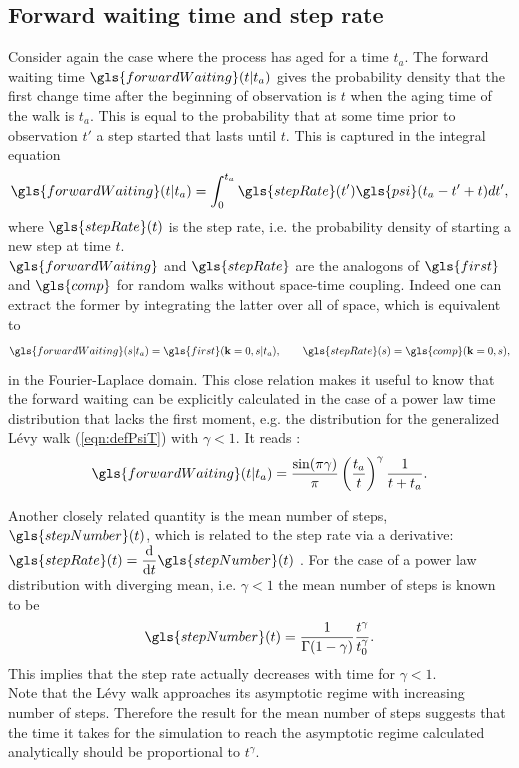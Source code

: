 \subsection{Forward waiting time and step rate} 
\label{sec:forwardWaiting}

Consider again the case where the process has aged for a time $t_a$. The forward waiting time $\gls{forwardWaiting}(t|t_a)$ gives the probability density that the first change time after the beginning of observation is $t$ when the aging time of the walk is $t_a$. This is equal to the probability that at some time prior to observation $t'$ a step started that lasts until $t$. This is captured in the integral equation 
%
\begin{align}
\gls{forwardWaiting}(t|t_a) = \int^{t_a}_{0} \gls{stepRate}(t') \gls{psi}(t_a-t'+t) dt',
\end{align}
%
where $\gls{stepRate}(t)$ is the step rate, i.e. the probability density of starting a new step at time $t$. \\
$\gls{forwardWaiting}$ and $\gls{stepRate}$ are the analogons of $\gls{first}$ and $\gls{comp}$ for random walks without space-time coupling. Indeed one can extract the former by integrating the latter over all of space, which is equivalent to
%
\begin{align}
\gls{forwardWaiting}(s|t_a) = \gls{first}(\ve{k}=0,s|t_a), \qquad \gls{stepRate}(s) = \gls{comp}(\ve{k}=0,s)  ,
\end{align}
%
in the Fourier-Laplace domain. This close relation makes it useful to know that the forward waiting can be explicitly calculated in the case of a power law time distribution that lacks the first moment, e.g. the distribution for the generalized L\'evy walk (\ref{eqn:defPsiT}) with $\gamma < 1$.  It reads 
\cite{firstSteps}:
%
\begin{align}
\gls{forwardWaiting}(t|t_a) = \frac{\sin(\pi \gamma)}{\pi} \left( \frac{t_a}{t} \right)^{\gamma} \frac{1}{t+t_a} \label{eqn:forwardWaiting} .
\end{align}

Another closely related quantity is the mean number of steps, $\gls{stepNumber} (t)$, which is related to the step rate via a derivative: {\color{red} 
$\gls{stepRate}(t) = \der{}{t} \gls{stepNumber} (t)$ 
}. For the case of a power law distribution with diverging mean, i.e. $\gamma <1$ the mean number of steps is known to be 
\cite{firstSteps}
%
\begin{align}
\gls{stepNumber} (t) = \frac{1}{\Gamma(1-\gamma)} \frac{t^{\gamma}}{t_0^{\gamma}} . 
\end{align}
%
This implies that the step rate actually decreases with time for $\gamma < 1$.\\
Note that the L\'evy walk approaches its asymptotic regime with increasing number of steps. Therefore the result for the mean number of steps suggests that the time it takes for the simulation to reach the asymptotic regime calculated analytically should be proportional to $t^{\gamma}$.


